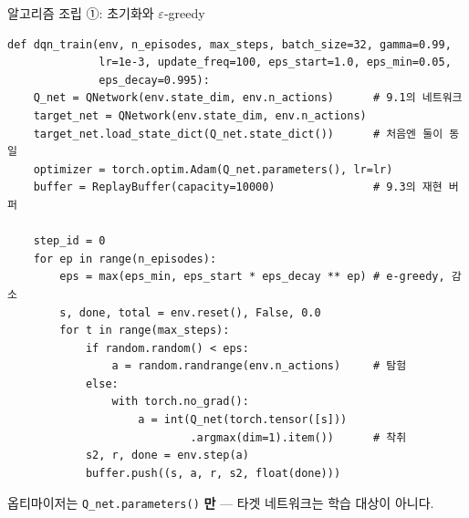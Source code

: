 \begin{frame}[fragile]{알고리즘 조립 ①: 초기화와 $\varepsilon$-greedy}
\begin{lstlisting}
def dqn_train(env, n_episodes, max_steps, batch_size=32, gamma=0.99,
              lr=1e-3, update_freq=100, eps_start=1.0, eps_min=0.05,
              eps_decay=0.995):
    Q_net = QNetwork(env.state_dim, env.n_actions)      # 9.1의 네트워크
    target_net = QNetwork(env.state_dim, env.n_actions)
    target_net.load_state_dict(Q_net.state_dict())      # 처음엔 둘이 동일
    optimizer = torch.optim.Adam(Q_net.parameters(), lr=lr)
    buffer = ReplayBuffer(capacity=10000)               # 9.3의 재현 버퍼

    step_id = 0
    for ep in range(n_episodes):
        eps = max(eps_min, eps_start * eps_decay ** ep) # e-greedy, 감소
        s, done, total = env.reset(), False, 0.0
        for t in range(max_steps):
            if random.random() < eps:
                a = random.randrange(env.n_actions)     # 탐험
            else:
                with torch.no_grad():
                    a = int(Q_net(torch.tensor([s]))
                            .argmax(dim=1).item())      # 착취
            s2, r, done = env.step(a)
            buffer.push((s, a, r, s2, float(done)))
\end{lstlisting}
  {\footnotesize 옵티마이저는 \texttt{Q\_net.parameters()} \textbf{만} ---
  타겟 네트워크는 학습 대상이 아니다.}
\end{frame}
